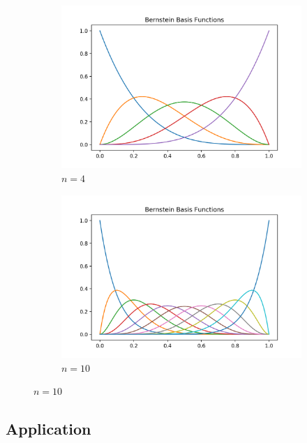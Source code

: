 \documentclass[12pt, letterpaper]{article}
\begin{document}
\begin{figure}[h]
  \begin{center}
    \begin{subfigure}[b]{.45\linewidth}
      \includegraphics[width=\linewidth]{Basis/basis4}
      \caption{$n=4$}
    \end{subfigure}
    \begin{subfigure}[b]{.45\linewidth}
      \includegraphics[width=\linewidth]{Basis/basis10}
      \caption{$n=10$}
    \end{subfigure}
  \end{center}
\end{figure}

\subsection{Application}



\end{document}
